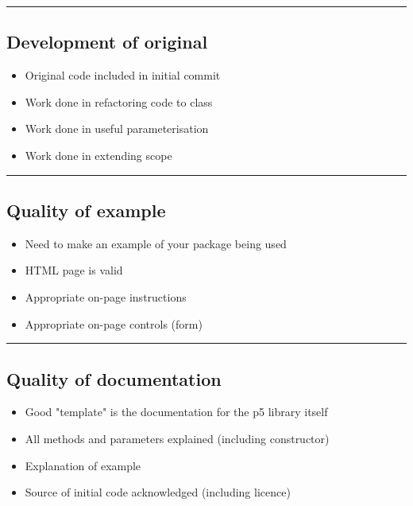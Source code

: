\documentclass{article}[18pt]
\providecommand{\tightlist}{%
	\setlength{\itemsep}{0pt}\setlength{\parskip}{0pt}}
\begin{document}
\begin{center}\rule{0.5\linewidth}{\linethickness}\end{center}

\hypertarget{development-of-original}{%
	\subsection{Development of original}\label{development-of-original}}

\begin{itemize}
	\tightlist
	\item
	Original code included in initial commit
	\item
	Work done in refactoring code to class
	\item
	Work done in useful parameterisation
	\item
	Work done in extending scope
\end{itemize}

\begin{center}\rule{0.5\linewidth}{\linethickness}\end{center}

\hypertarget{quality-of-example}{%
	\subsection{Quality of example}\label{quality-of-example}}

\begin{itemize}
	\tightlist
	\item Need to make an example of your package being used
	\item
	HTML page is valid
	\item
	Appropriate on-page instructions
	\item
	Appropriate on-page controls (form)
\end{itemize}

\begin{center}\rule{0.5\linewidth}{\linethickness}\end{center}

\hypertarget{quality-of-documentation}{%
	\subsection{Quality of documentation}\label{quality-of-documentation}}

\begin{itemize}
	\tightlist
	\item Good "template" is the documentation for the p5 library itself
	\item
	All methods and parameters explained (including constructor)
	\item
	Explanation of example
	\item
	Source of initial code acknowledged (including licence)
\end{itemize}
\end{document}
